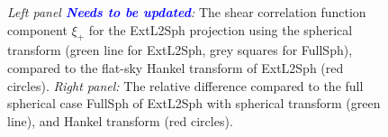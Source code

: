 \documentclass[fleqn,usenatbib]{mnras} %
\newcommand{\mk}[1]{{\bf\textcolor{blue}{#1}}}
\begin{document}
\begin{figure}

  \begin{center}
  \end{center}

  \caption{\emph{Left panel \mk{Needs to be updated}:} The shear correlation function component $\xi_+$
for the ExtL2Sph projection using the spherical transform (green line for
ExtL2Sph, grey squares for FullSph), compared to the flat-sky Hankel transform
of ExtL2Sph (red circles). \emph{Right panel:} The relative difference compared
to the full spherical case FullSph of ExtL2Sph with spherical transform (green
line), and Hankel transform (red circles).}

  \label{fig:xi_p_wigner}

\end{figure}
\end{document}
